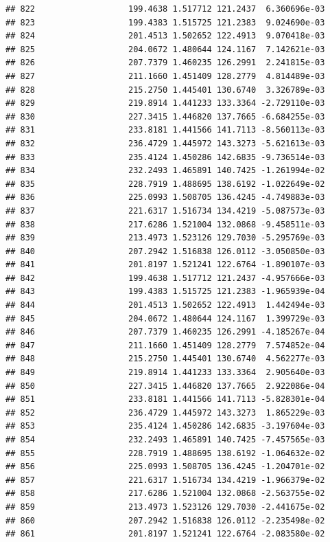 \documentclass[
]{article}
\begin{document}
\begin{verbatim}
## 822                   199.4638 1.517712 121.2437  6.360696e-03
## 823                   199.4383 1.515725 121.2383  9.024690e-03
## 824                   201.4513 1.502652 122.4913  9.070418e-03
## 825                   204.0672 1.480644 124.1167  7.142621e-03
## 826                   207.7379 1.460235 126.2991  2.241815e-03
## 827                   211.1660 1.451409 128.2779  4.814489e-03
## 828                   215.2750 1.445401 130.6740  3.326789e-03
## 829                   219.8914 1.441233 133.3364 -2.729110e-03
## 830                   227.3415 1.446820 137.7665 -6.684255e-03
## 831                   233.8181 1.441566 141.7113 -8.560113e-03
## 832                   236.4729 1.445972 143.3273 -5.621613e-03
## 833                   235.4124 1.450286 142.6835 -9.736514e-03
## 834                   232.2493 1.465891 140.7425 -1.261994e-02
## 835                   228.7919 1.488695 138.6192 -1.022649e-02
## 836                   225.0993 1.508705 136.4245 -4.749883e-03
## 837                   221.6317 1.516734 134.4219 -5.087573e-03
## 838                   217.6286 1.521004 132.0868 -9.458511e-03
## 839                   213.4973 1.523126 129.7030 -5.295769e-03
## 840                   207.2942 1.516838 126.0112 -3.050850e-03
## 841                   201.8197 1.521241 122.6764 -1.890107e-03
## 842                   199.4638 1.517712 121.2437 -4.957666e-03
## 843                   199.4383 1.515725 121.2383 -1.965939e-04
## 844                   201.4513 1.502652 122.4913  1.442494e-03
## 845                   204.0672 1.480644 124.1167  1.399729e-03
## 846                   207.7379 1.460235 126.2991 -4.185267e-04
## 847                   211.1660 1.451409 128.2779  7.574852e-04
## 848                   215.2750 1.445401 130.6740  4.562277e-03
## 849                   219.8914 1.441233 133.3364  2.905640e-03
## 850                   227.3415 1.446820 137.7665  2.922086e-04
## 851                   233.8181 1.441566 141.7113 -5.828301e-04
## 852                   236.4729 1.445972 143.3273  1.865229e-03
## 853                   235.4124 1.450286 142.6835 -3.197604e-03
## 854                   232.2493 1.465891 140.7425 -7.457565e-03
## 855                   228.7919 1.488695 138.6192 -1.064632e-02
## 856                   225.0993 1.508705 136.4245 -1.204701e-02
## 857                   221.6317 1.516734 134.4219 -1.966379e-02
## 858                   217.6286 1.521004 132.0868 -2.563755e-02
## 859                   213.4973 1.523126 129.7030 -2.441675e-02
## 860                   207.2942 1.516838 126.0112 -2.235498e-02
## 861                   201.8197 1.521241 122.6764 -2.083580e-02

\end{verbatim}
\end{document}
